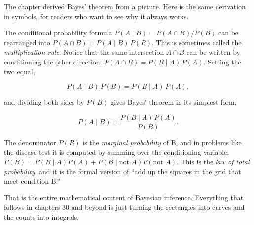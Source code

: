 \documentclass[
  letterpaper,
  11pt,
  twoside,
  openany]{scrbook}
\begin{document}
\begin{tcolorbox}[enhanced jigsaw, arc=.35mm, bottomrule=.15mm, bottomtitle=1mm, breakable, colback=white, colbacktitle=quarto-callout-note-color!10!white, colframe=quarto-callout-note-color-frame, coltitle=black, left=2mm, leftrule=.75mm, opacityback=0, opacitybacktitle=0.6, rightrule=.15mm, title=\textcolor{quarto-callout-note-color}{\faInfo}\hspace{0.5em}{Inside the math: Bayes from first principles}, titlerule=0mm, toprule=.15mm, toptitle=1mm]

The chapter derived Bayes' theorem from a picture. Here is the same
derivation in symbols, for readers who want to see why it always works.

The conditional probability formula \(P(A \mid B) = P(A \cap B) / P(B)\)
can be rearranged into \(P(A \cap B) = P(A \mid B) \, P(B)\). This is
sometimes called the \emph{multiplication rule}. Notice that the same
intersection \(A \cap B\) can be written by conditioning the other
direction: \(P(A \cap B) = P(B \mid A) \, P(A)\). Setting the two equal,

\[
P(A \mid B) \, P(B) = P(B \mid A) \, P(A),
\]

and dividing both sides by \(P(B)\) gives Bayes' theorem in its simplest
form,

\[
P(A \mid B) = \frac{P(B \mid A) \, P(A)}{P(B)}.
\]

The denominator \(P(B)\) is the \emph{marginal probability} of B, and in
problems like the disease test it is computed by summing over the
conditioning variable:
\(P(B) = P(B \mid A) P(A) + P(B \mid \text{not } A) P(\text{not } A)\).
This is the \emph{law of total probability}, and it is the formal
version of ``add up the squares in the grid that meet condition B.''

That is the entire mathematical content of Bayesian inference.
Everything that follows in chapters 30 and beyond is just turning the
rectangles into curves and the counts into integrals.

\end{tcolorbox}
\end{document}

